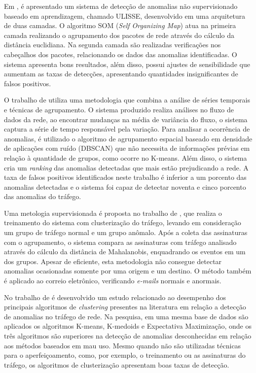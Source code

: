 \indent Em \cite{Zanero2008}, é apresentado um sistema de detecção de anomalias não supervisionado baseado em aprendizagem, chamado ULISSE, desenvolvido em uma arquitetura de duas camadas. O algoritmo SOM (\textit{Self Organizing Map}) atua na primeira camada realizando o agrupamento dos pacotes de rede através do cálculo da distância euclidiana. Na segunda camada são realizadas verificações nos cabeçalhos dos pacotes, relacionando os dados das anomalias identificadas. O sistema apresenta bons resultados, além disso, possui ajustes de sensibilidade que aumentam as taxas de detecções, apresentando quantidades insignificantes de falsos positivos.

\indent O trabalho de  utiliza uma metodologia que combina a análise de séries temporais e técnicas de agrupamento. O sistema produzido realiza análises no fluxo de dados da rede, ao encontrar mudanças na média de variância do fluxo, o sistema captura a série de tempo responsável pela variação. Para analisar a ocorrência de anomalias, é utilizado o algoritmo de agrupamento espacial baseado em densidade de aplicações com ruído (DBSCAN) que não necessita de informações prévias em relação à quantidade de grupos, como ocorre no K-means. Além disso, o sistema cria um \textit{ranking} das anomalias detectadas que mais estão prejudicando a rede. A taxa de falsos positivos identificados neste trabalho é inferior a um porcento das anomalias detectadas e o sistema foi capaz de detectar noventa e cinco porcento das anomalias do tráfego.

\indent Uma metologia supervisionada é proposta no trabalho de , que realiza o treinamento do sistema com clusterização do tráfego, levando em consideração um grupo de tráfego normal e um grupo anômalo. Após a coleta das assinaturas com o agrupamento, o sistema compara as assinaturas com tráfego analisado através do cálculo da distância de Mahalanobis, enquadrando os eventos em um dos grupos. Apesar de eficiente, esta metodologia não consegue detectar anomalias ocasionadas somente por uma origem e um destino. O método também é aplicado ao correio eletrônico, verificando \textit{e-mails} normais e anormais.

\indent No trabalho de  é desenvolvido um estudo relacionado ao desempenho dos principais algoritmos de \textit{clustering} presentes na literatura em relação a detecção de anomalias no tráfego de rede. Na pesquisa, em uma mesma base de dados são aplicados os algoritmos K-means, K-medoids e Expectativa Maximização, onde os três algoritmos são superiores na detecção de anomalias desconhecidas em relação aos métodos baseados em mau uso. Mesmo quando não são utilizadas técnicas para o aperfeiçoamento, como, por exemplo, o treinamento ou as assinaturas do tráfego, os algoritmos de clusterização apresentam boas taxas de detecção.

